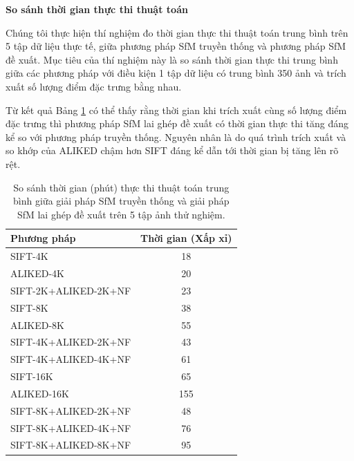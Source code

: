 \textbf{So sánh thời gian thực thi thuật toán}

Chúng tôi thực hiện thí nghiệm đo thời gian thực thi thuật toán trung bình trên 5 tập dữ liệu thực tế, giữa phương pháp SfM truyền thống và phương pháp SfM đề xuất. Mục tiêu của thí nghiệm này là so sánh thời gian thực thi trung bình giữa các phương pháp với điều kiện 1 tập dữ liệu có trung bình 350 ảnh và trích xuất số lượng điểm đặc trưng bằng nhau.

Từ kết quả Bảng \ref{tab:time} có thể thấy rằng thời gian khi trích xuất cùng số lượng điểm đặc trưng thì phương pháp SfM lai ghép đề xuất có thời gian thực thi tăng đáng kể so với phương pháp truyền thống. Nguyên nhân là do quá trình trích xuất và so khớp của ALIKED chậm hơn SIFT đáng kể dẫn tới thời gian bị tăng lên rõ rệt.
    \begin{table}[H]
    \centering
    \footnotesize
    \begin{tabular}{|l|c|}
    \hline
    \textbf{Phương pháp} & \textbf{Thời gian (Xấp xỉ)} \\
    \hline
    SIFT-4K & 18 \\
    ALIKED-4K & 20 \\ %
    SIFT-2K+ALIKED-2K+NF & 23  \\
    \hline
    SIFT-8K &  38 \\
    ALIKED-8K &  55 \\ %
    SIFT-4K+ALIKED-2K+NF & 43 \\
    SIFT-4K+ALIKED-4K+NF & 61  \\
    \hline
    SIFT-16K & 65\\
    ALIKED-16K & 155  \\ 
    SIFT-8K+ALIKED-2K+NF & 48 \\
    SIFT-8K+ALIKED-4K+NF & 76  \\
    SIFT-8K+ALIKED-8K+NF & 95 \\ 
    \hline
    \end{tabular}
    \caption{So sánh thời gian (phút) thực thi thuật toán trung bình giữa giải pháp SfM truyền thống và giải pháp SfM lai ghép đề xuất trên 5 tập ảnh thử nghiệm.}
    \label{tab:time}
    \end{table}

